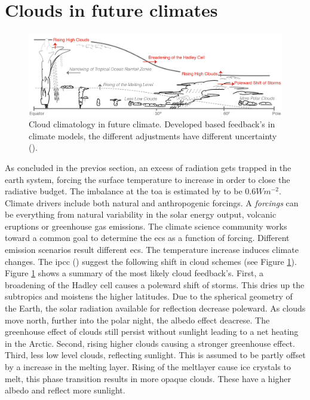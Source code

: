 \section{Clouds in future climates} \label{sec:intro_cloud_future_climates}
\begin{figure}[h]
    \centering
    \includegraphics[scale = 0.8]{Chapter1_Intro/images/Fig7-11_ipcc.jpg}
    \caption{Cloud climatology in future climate. Developed based feedback's in climate models, the different adjustments have different uncertainty (\cite{IPCC_CH7_clouds}).}
    \label{fig:cloud_scheme}
\end{figure}
As concluded in the previos section, an excess of radiation gets trapped in the earth system, forcing the surface temperature to increase in order to close the radiative budget. The imbalance at the \acrshort{toa} is estimated by \citeauthor{Wild2019TheModels} to be $0.6W m^{-2}$. 
Climate drivers include both natural and anthropogenic forcings. A \textit{forcings} can be everything from natural variability in the solar energy output, volcanic eruptions or greenhouse gas emissions. The climate science community works toward a common goal to determine the \acrshort{ecs} as a function of forcing. Different emission scenarios result different \acrshort{ecs}. The temperature increase induces climate changes. The \acrshort{ipcc} (\cite{IPCC_CH7_clouds}) suggest the following shift in cloud schemes (see Figure \ref{fig:cloud_scheme}). Figure \ref{fig:cloud_scheme} shows a summary of the most likely cloud feedback's. First, a broadening of the Hadley cell causes a poleward shift of storms. This dries up the subtropics and moistens the higher latitudes. Due to the spherical geometry of the Earth, the solar radiation available for reflection decrease poleward. %
As clouds move north, further into the polar night, the albedo effect deacrese. The greenhouse effect of clouds still persist without sunlight leading to a net heating in the Arctic. Second, rising higher clouds causing a stronger greenhouse effect. Third, less low level clouds, reflecting sunlight. This is assumed to be partly offset by a increase in the melting layer. Rising of the meltlayer cause ice crystals to melt, this phase transition results in more opaque clouds. These have a higher albedo and reflect more sunlight. 